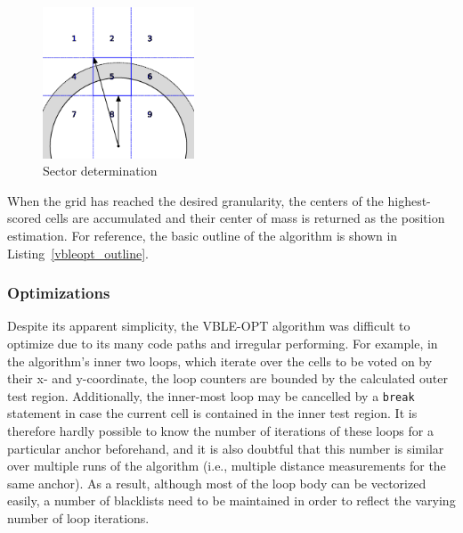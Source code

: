 \begin{figure}
\begin{center}
\includegraphics[width=0.4\textwidth]{img/vble_sector.eps}
\end{center}
\caption{Sector determination}
\label{fig:vble_sector}
\end{figure}

When the grid has reached the desired granularity, the centers of the highest-scored cells are accumulated and their center of mass is returned as the position estimation. For reference, the basic outline of the algorithm is shown in Listing~\ref{vbleopt_outline}.


\subsubsection{Optimizations}
Despite its apparent simplicity, the VBLE-OPT algorithm was difficult to optimize due to its many code paths and irregular performing. For example, in the algorithm's inner two loops, which iterate over the cells to be voted on by their x- and y-coordinate, the loop counters are bounded by the calculated outer test region. Additionally, the inner-most loop may be cancelled by a \texttt{break} statement in case the current cell is contained in the inner test region. It is therefore hardly possible to know the number of iterations of these loops for a particular anchor beforehand, and it is also doubtful that this number is similar over multiple runs of the algorithm (i.e., multiple distance measurements for the same anchor). As a result, although most of the loop body can be vectorized easily, a number of blacklists need to be maintained in order to reflect the varying number of loop iterations.

